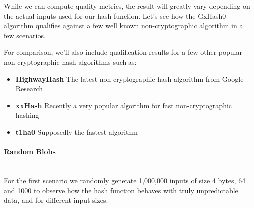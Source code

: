\documentclass[10pt]{article}
\begin{document}
While we can compute quality metrics, the result will greatly vary depending on the actual inputs used for our hash function. Let's see how the GxHash0 algorithm qualifies against a few well known non-cryptographic algorithm in a few scenarios.

For comparison, we'll also include qualification results for a few other popular non-cryptographic hash algorithms such as:

\begin{itemize}
\item \textbf{HighwayHash}\cite{highwayhash} The latest non-cryptographic hash algorithm from Google Research
\item \textbf{xxHash}\cite{twox-hash} Recently a very popular algorithm for fast non-cryptographic hashing
\item \textbf{t1ha0}\cite{rust-t1ha} Supposedly the fastest algorithm
\end{itemize}

\clearpage
\paragraph{Random Blobs}\leavevmode\\
For the first scenario we randomly generate 1,000,000 inputs of size 4 bytes, 64 and 1000 to observe how the hash function behaves with truly unpredictable data, and for different input sizes.
\end{document}
